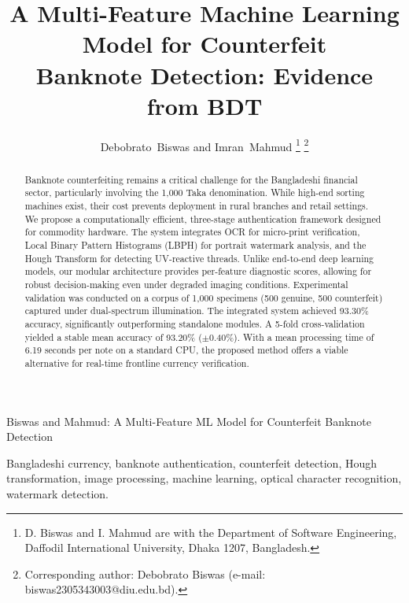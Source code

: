 \documentclass[journal]{IEEEtran}
\begin{document}
\title{A Multi-Feature Machine Learning Model for Counterfeit\\
Banknote Detection: Evidence from BDT}

\author{Debobrato~Biswas and Imran~Mahmud%
\thanks{D. Biswas and I. Mahmud are with the Department of Software
Engineering, Daffodil International University, Dhaka 1207, Bangladesh.}%
\thanks{Corresponding author: Debobrato Biswas
(e-mail: biswas2305343003@diu.edu.bd).}}

%
{Biswas and Mahmud: A Multi-Feature ML Model for Counterfeit Banknote Detection}

\maketitle

\begin{abstract}
Banknote counterfeiting remains a critical challenge for the Bangladeshi financial sector, particularly involving the 1,000 Taka denomination. While high-end sorting machines exist, their cost prevents deployment in rural branches and retail settings. We propose a computationally efficient, three-stage authentication framework designed for commodity hardware. The system integrates OCR for micro-print verification, Local Binary Pattern Histograms (LBPH) for portrait watermark analysis, and the Hough Transform for detecting UV-reactive threads. Unlike end-to-end deep learning models, our modular architecture provides per-feature diagnostic scores, allowing for robust decision-making even under degraded imaging conditions. Experimental validation was conducted on a corpus of 1,000 specimens (500 genuine, 500 counterfeit) captured under dual-spectrum illumination. The integrated system achieved 93.30\% accuracy, significantly outperforming standalone modules. A 5-fold cross-validation yielded a stable mean accuracy of 93.20\% ($\pm$0.40\%). With a mean processing time of 6.19 seconds per note on a standard CPU, the proposed method offers a viable alternative for real-time frontline currency verification.
\end{abstract}

\begin{IEEEkeywords}
Bangladeshi currency, banknote authentication, counterfeit detection, Hough transformation, image processing, machine learning, optical character recognition, watermark detection.
\end{IEEEkeywords}
\end{document}
